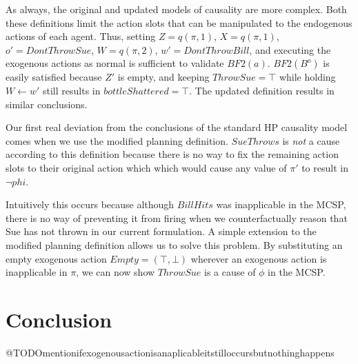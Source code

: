 \documentclass{article}
\theoremstyle{plain}
\theoremstyle{definition}
\begin{document}
As always, the original and updated models of causality are more complex. Both these definitions limit the action slots that can be manipulated to the endogenous actions of each agent. Thus, setting $Z=q(\pi,1)$, $X=q(\pi,1)$, $o'=DontThrowSue$, $W=q(\pi,2)$, $w'=DontThrowBill$, and executing the exogenous actions as normal is sufficient to validate $BF2(a)$. $BF2(B^o)$ is easily satisfied because $Z'$ is empty, and keeping $ThrowSue=\top$ while holding $W\leftarrow w'$ still results in $bottleShattered=\top$. The updated definition results in similar conclusions.

Our first real deviation from the conclusions of the standard HP causality model comes when we use the modified planning definition. $SueThrows$ is \textit{not} a cause according to this definition because there is no way to fix the remaining action slots to their original action which which would cause any value of $\pi'$ to result in $\lnot phi$.

Intuitively this occurs because although $BillHits$ was inapplicable in the MCSP, there is no way of preventing it from firing when we counterfactually reason that Sue has not thrown in our current formulation. A simple extension to the modified planning definition allows us to solve this problem. By substituting an empty exogenous action $Empty=(\top, \bot)$ wherever an exogenous action is inapplicable in $\pi$, we can now show $ThrowSue$ is a cause of $\phi$ in the MCSP.

\section{Conclusion}
@TODOmentionifexogenousactionisanaplicableitstilloccursbutnothinghappens












 
\end{document}
